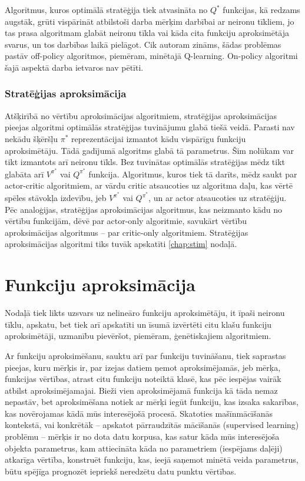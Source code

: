 \documentclass{ludis} %
\begin{document}
Algoritmus, kuros optimālā stratēģija tiek atvasināta no $Q^*$ funkcijas, kā redzams augstāk, grūti vispārināt atbilstoši darba mērķim darbībai ar neironu tīkliem, jo tas prasa algoritmam glabāt neironu tīkla vai kāda cita funkciju aproksimētāja svarus, un tos darbības laikā pielāgot.
Cik autoram zināms, šādas problēmas pastāv off-policy algoritmos, piemēram, minētajā Q-learning.
On-policy algoritmi šajā aspektā darba ietvaros nav pētīti.

\subsection{Stratēģijas aproksimācija}
Atšķirībā no vērtību aproksimācijas algoritmiem, stratēģijas aproksimācijas pieejas algoritmi optimālās stratēģijas tuvinājumu glabā tiešā veidā.
Parasti nav nekādu šķēršļu $\pi^*$ reprezentācijai izmantot kādu vispārīgu funkciju aproksimētāju. Tādā gadījumā algoritms glabā tā parametrus.
Šim nolūkam var tikt izmantots arī neironu tīkls.
Bez tuvinātas optimālās stratēģijas mēdz tikt glabāta arī $V^{\pi^*}$ vai $Q^{\pi^*}$ funkcija.
Algoritmus, kuros tiek tā darīts, mēdz saukt par actor-critic algoritmiem, ar vārdu critic atsaucoties uz algoritma daļu, kas vērtē spēles stāvokļa izdevību, jeb $V^{\pi^*}$ vai $Q^{\pi^*}$, un ar actor atsaucoties uz stratēģiju.
Pēc analoģijas, stratēģijas aproksimācijas algoritmus, kas neizmanto kādu no vērtību funkcijām, dēvē par actor-only algoritmie, savukārt vērtību aproksimācijas algoritmus -- par critic-only algoritmiem.
Stratēģijas aproksimācijas algoritmi tiks tuvāk apskatīti \ref{chap:stim} nodaļā.

\chapter{Funkciju aproksimācija}
Nodaļā tiek likts uzsvars uz nelineāro funkciju aproksimētāju, it īpaši neironu tīklu, apskatu, bet tiek arī apskatīti un īsumā izvērtēti citu klašu funkciju aproksimētāji, uzmanību pievēršot, piemēram, ģenētiskajiem algoritmiem.

Ar funkciju aproksimēšanu, sauktu arī par funkciju tuvināšanu, tiek saprastas pieejas, kuru mērķis ir, par izejas datiem ņemot aproksimējamās, jeb mērķa, funkcijas vērtības, atrast citu funkciju noteiktā klasē, kas pēc iespējas vairāk atbilst aproksimējamajai.
Bieži vien aproksimējamā funkcija kā tāda nemaz nepastāv, bet aproksimēšana notiek ar mērķi iegūt funkciju, kas izsaka sakarības, kas novērojamas kādā mūs interesējošā procesā.
Skatoties mašīnmācīšanās kontekstā, vai konkrētāk -- apskatot pārraudzītās mācīšanās (supervised learning) problēmu -- mērķis ir no dota datu korpusa, kas satur kāda mūs interesējoša objekta parametrus, kam attiecināta kāda no parametriem (iespējams daļēji) atkarīga vērtība, konstruēt funkciju, kas, ieejā saņemot minētā veida parametrus, būtu spējīga prognozēt iepriekš neredzētu datu punktu vērtības.
\end{document}
